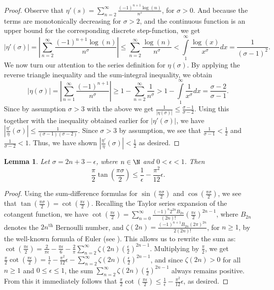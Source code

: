 \documentclass{amsart}
\theoremstyle{plain}
\newtheorem{lemma}[theorem]{Lemma}
\theoremstyle{definition}
\begin{document}
\begin{proof}
Observe that $\eta'(s) = \sum\limits_{n=2}^{\infty}\frac{(-1)^{n+1}\log(n)}{n^s}$, for $\sigma>0$. And because the terms are monotonically decreasing for $\sigma>2$, and the continuous function is an upper bound for the corresponding discrete step-function, we get
\[
|\eta'(\sigma)|=\left| \sum\limits_{n=2}^{\infty}\frac{(-1)^{n+1}\log(n)}{n^\sigma}\right|\leq \sum\limits_{n=2}^{\infty}\frac{\log(n)}{n^\sigma} < \int\limits_{1}^{\infty}\frac{\log(x)}{x^\sigma}dx=\frac{1}{(\sigma-1)^2}.
\]
We now turn our attention to the series definition for $\eta(\sigma)$.  By applying the reverse triangle inequality and the sum-integral inequality, we obtain
\[
|\eta(\sigma)|=\left|\sum\limits_{n=1}^{\infty}\frac{(-1)^{n+1}}{n^\sigma}\right|\geq 1-\sum\limits_{n=2}^{\infty}\frac{1}{n^\sigma} > 1 - \int\limits_{1}^{\infty}\frac{1}{x^\sigma}dx = \frac{\sigma-2}{\sigma-1}.
\]
Since by assumption $\sigma>3$ with the above we get $\frac{1}{|\eta(\sigma)|}\leq\frac{\sigma-1}{\sigma-2}$.  Using this together with the inequality obtained earlier for $|\eta'(\sigma)|$, we have $\left|\frac{\eta'}{\eta}(\sigma)\right|\leq\frac{1}{(\sigma-1)(\sigma-2)}$.  Since $\sigma>3$ by assumption, we see that $\frac{1}{\sigma-1}<\frac{1}{2}$ and $\frac{1}{\sigma-2}<1$.  Thus, we have shown $\left| \frac{\eta'}{\eta}(\sigma) \right| < \frac{1}{2}$ as desired.
\end{proof}

\begin{lemma}\label{lemma:cotIneq}
Let $\sigma = 2n+3-\epsilon$, where $n\in\N$ and $0<\epsilon<1$. Then $$\frac{\pi}{2}\tan\left( \frac{\pi \sigma}{2}\right)\leq\frac{1}{\epsilon} - \frac{\pi^2}{12}\epsilon. $$
\end{lemma}

\begin{proof}
Using the sum-difference formulas for $\sin\left( \frac{\pi\sigma}{2} \right)$ and $\cos\left( \frac{\pi\sigma}{2} \right)$, we see that
$\tan\left( \frac{\pi \sigma}{2} \right) = \cot\left( \frac{\pi\epsilon}{2}\right)$. Recalling the Taylor series expansion of the cotangent function, we have
$\cot\left(\frac{\pi\epsilon}{2} \right) = \sum\limits_{n=0}^{\infty} \frac{(-1)^n 2^{2n}B_{2n}}{(2n)!} \left( \frac{\pi\epsilon}{2}\right)^{2n-1}$, where $B_{2n}$ denotes the $2n^{\text{th}}$ Bernoulli number, and $\zeta(2n) = \frac{(-1)^{n+1}B_{2n}(2\pi)^{2n}}{2(2n)!}$, for $n\geq 1$, by the well-known formula of Euler (see \cite{euler34}). This allows us to rewrite the sum as:  $\cot\left( \frac{\pi\epsilon}{2} \right)=\frac{2}{\pi\epsilon} - \frac{\pi\epsilon}{6} - \frac{2}{\pi}\sum\limits_{n=2}^{\infty}\zeta(2n)\left( \frac{\epsilon}{2}\right)^{2n-1}$. Multiplying by $\frac{\pi}{2}$, we get
$\frac{\pi}{2}\cot\left(\frac{\pi\epsilon}{2}\right)=\frac{1}{\epsilon}-\frac{\pi^2}{12}\epsilon - \sum\limits_{n=2}^{\infty}\zeta(2n)\left( \frac{\epsilon}{2} \right)^{2n-1}$, and since $\zeta(2n)>0$ for all $n\geq 1$ and $0 \leq \epsilon \leq 1$, the sum $\sum\limits_{n=2}^{\infty}\zeta(2n)\left( \frac{\epsilon}{2} \right)^{2n-1}$ always remains positive. From this
it immediately follows that $\frac{\pi}{2}\cot\left( \frac{\pi\epsilon}{2}\right) \leq \frac{1}{\epsilon} - \frac{\pi^2}{12}\epsilon$, as desired.
\end{proof}
\end{document}
